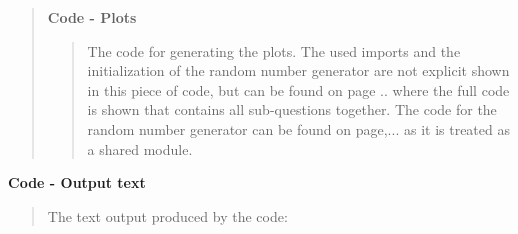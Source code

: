 \begin{quote}
\textbf{Code - Plots}



\begin{quote}
The code for generating the plots. The used imports and the initialization of the random number generator are not explicit shown in this piece of code, but can be found on page .. where the full code is shown that contains all sub-questions together. The code for the random number generator can be found on page,... as it is treated as a shared module.


\end{quote}
\end{quote}

\textbf{Code - Output text } 
\begin{quote}
The text output produced by the code:

\end{quote}
\newpage

